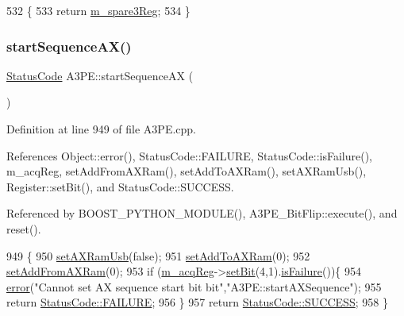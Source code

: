 \begin{DoxyCode}
532                        \{
533     \textcolor{keywordflow}{return} \hyperlink{classA3PE_a1e7e5c89f190672990ae5bece2a8b1aa}{m\_spare3Reg};
534   \}
\end{DoxyCode}
\mbox{\label{classA3PE_a91ae249ca14676f8b0832487955fcf8c}} 
\subsubsection{\texorpdfstring{start\+Sequence\+A\+X()}{startSequenceAX()}}
{\footnotesize\ttfamily \hyperlink{classStatusCode}{Status\+Code} A3\+P\+E\+::start\+Sequence\+AX (\begin{DoxyParamCaption}{ }\end{DoxyParamCaption})}



Definition at line 949 of file A3\+P\+E.\+cpp.



References Object\+::error(), Status\+Code\+::\+F\+A\+I\+L\+U\+RE, Status\+Code\+::is\+Failure(), m\+\_\+acq\+Reg, set\+Add\+From\+A\+X\+Ram(), set\+Add\+To\+A\+X\+Ram(), set\+A\+X\+Ram\+Usb(), Register\+::set\+Bit(), and Status\+Code\+::\+S\+U\+C\+C\+E\+SS.



Referenced by B\+O\+O\+S\+T\+\_\+\+P\+Y\+T\+H\+O\+N\+\_\+\+M\+O\+D\+U\+L\+E(), A3\+P\+E\+\_\+\+Bit\+Flip\+::execute(), and reset().


\begin{DoxyCode}
949                                 \{
950   \hyperlink{classA3PE_a77ccfbd9df2fad96a9a9f1dc579a7a2d}{setAXRamUsb}(\textcolor{keyword}{false});
951   \hyperlink{classA3PE_a54fe4da570ea8833fe2c981de1085387}{setAddToAXRam}(0);
952   \hyperlink{classA3PE_a834fde5951d2c1bf6b41842520360fce}{setAddFromAXRam}(0);
953   \textcolor{keywordflow}{if} (\hyperlink{classA3PE_abaf426f4c9192537117b77f9f4821e04}{m\_acqReg}->\hyperlink{classRegister_ab094246dd12aa7e0aa0ca917f4e70b31}{setBit}(4,1).\hyperlink{classStatusCode_a5dd22dc6eb2c52fc4cabc58f6dea2eb7}{isFailure}())\{
954     \hyperlink{classObject_a204a95f57818c0f811933917a30eff45}{error}(\textcolor{stringliteral}{"Cannot set AX sequence start bit bit"},\textcolor{stringliteral}{"A3PE::startAXSequence"});
955     \textcolor{keywordflow}{return} \hyperlink{classStatusCode_a6f565cbeadc76d14c72f047e5e85eb4ba3da73d4c469762eb9d3c960368252b26}{StatusCode::FAILURE};
956   \}
957   \textcolor{keywordflow}{return} \hyperlink{classStatusCode_a6f565cbeadc76d14c72f047e5e85eb4badd0da38d3ba0d922efd1f4619bc37ad8}{StatusCode::SUCCESS};
958 \}
\end{DoxyCode}
\mbox{\label{classA3PE_af260fc8bce78935b7bad57c987574683}} 
